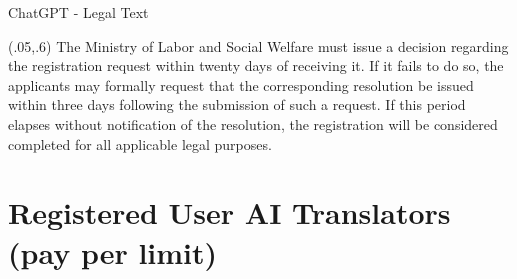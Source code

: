 \documentclass{beamer}
\begin{document}
\begin{frame} {ChatGPT - Legal Text}


 
 \begin{textblock}{1}(.05,.6)
  \footnotesize {The Ministry of Labor and Social Welfare must issue a decision regarding the registration request within twenty days of receiving it. If it fails to do so, the applicants may formally request that the corresponding resolution be issued within three days following the submission of such a request. If this period elapses without notification of the resolution, the registration will be considered completed for all applicable legal purposes.}
\end{textblock}
 
\end{frame}



\section{Registered User AI Translators \\
(pay per limit)}
\end{document}
